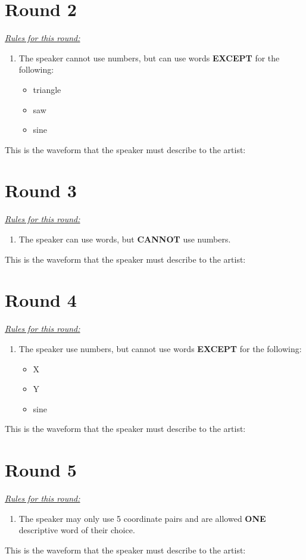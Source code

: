 \documentclass[12pt]{article}
\newcommand{\ben}{\begin{enumerate}}
\newcommand{\een}{\end{enumerate}}
\begin{document}
\section*{Round 2}
\vspace{5mm}
\underline{\textit{Rules for this round:}}
\ben
	\item{The speaker cannot use numbers, but can use words \textbf{EXCEPT} for the following:}
	\begin{itemize}
		\item triangle
		\item saw
		\item sine
	\end{itemize}
\een
\vspace{20mm}
This is the waveform that the speaker must describe to the artist:

\newpage
\section*{Round 3}
\vspace{5mm}
\underline{\textit{Rules for this round:}}
\ben
	\item{The speaker can use words, but \textbf{CANNOT} use numbers.}
\een
\vspace{20mm}
This is the waveform that the speaker must describe to the artist:

\newpage
\section*{Round 4}
\vspace{5mm}
\underline{\textit{Rules for this round:}}
\ben
	\item{The speaker use numbers, but cannot use words \textbf{EXCEPT} for the following:}
	\begin{itemize}
		\item X
		\item Y
		\item sine
	\end{itemize}
\een
\vspace{20mm}
This is the waveform that the speaker must describe to the artist:

\newpage
\section*{Round 5}
\vspace{5mm}
\underline{\textit{Rules for this round:}}
\ben
	\item{The speaker may only use 5 coordinate pairs and are allowed \textbf{ONE} descriptive word of their choice.}
\een
\vspace{20mm}
This is the waveform that the speaker must describe to the artist:
\end{document}
